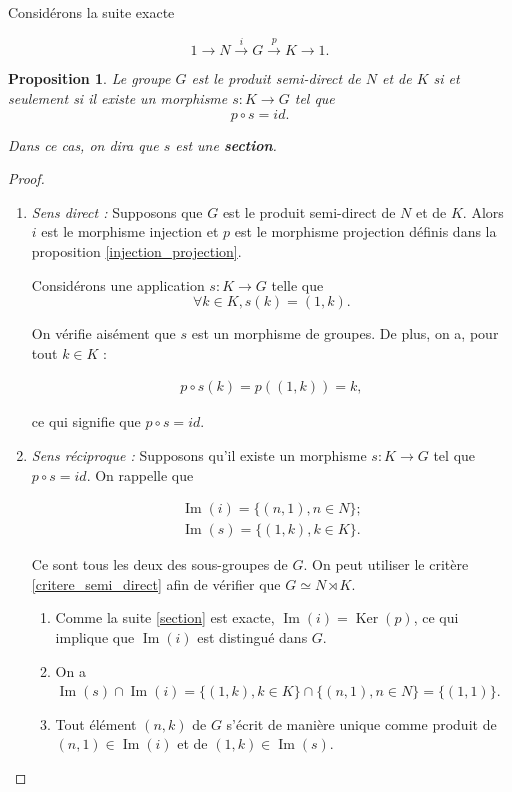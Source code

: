 \documentclass[french]{report}
\newtheorem{prop}{Proposition}[section]
\begin{document}
Considérons la suite exacte

\begin{equation} \label{section}
  1 \longrightarrow N \stackrel{i}{\longrightarrow} G \stackrel{p}{\longrightarrow} K \longrightarrow 1.
\end{equation}

\begin{prop}
  Le groupe $G$ est le produit semi-direct de $N$ et de $K$ si et seulement si il existe un morphisme $s : K \to G$ tel que $$ p \circ s = id.$$

  Dans ce cas, on dira que $s$ est une \textbf{section}.
\end{prop}

\begin{proof}
  \

  \begin{enumerate}
    \item \emph{Sens direct :} Supposons que $G$ est le produit semi-direct de $N$ et de $K$. Alors $i$ est le morphisme injection et $p$ est le morphisme projection définis dans la proposition \ref{injection_projection}.

    Considérons une application $s : K \to G$ telle que $$ \forall k \in K, s(k) = (1, k).$$

    On vérifie aisément que $s$ est un morphisme de groupes. De plus, on a, pour tout $k \in K$ :

    \begin{gather*}
      p \circ s (k) = p((1, k)) = k,
    \end{gather*}

    ce qui signifie que $p \circ s= id$.

    \item \emph{Sens réciproque :} Supposons qu'il existe  un morphisme $s : K \to G$ tel que $p \circ s = id$. On rappelle que

    \begin{gather*}
      \operatorname{Im}(i) = \{ (n,1), n \in N \} ; \\
      \operatorname{Im}(s) =  \{ (1, k), k \in K \} .
    \end{gather*}

    Ce sont tous les deux des sous-groupes de $G$. On peut utiliser le critère \ref{critere_semi_direct} afin de vérifier que $G \simeq N \rtimes K$.

    \begin{enumerate}
      \item Comme la suite \ref{section} est exacte, $\operatorname{Im}(i) = \operatorname{Ker}(p)$, ce qui implique que $\operatorname{Im}(i)$ est distingué dans $G$.
      \item On a $\operatorname{Im}(s) \cap \operatorname{Im}(i) = \{ (1,k), k \in K \} \cap \{ (n,1), n \in N \}  = \{ (1,1) \} $.
      \item Tout élément $(n,k)$ de $G$ s'écrit de manière unique comme produit de $(n,1) \in \operatorname{Im}(i)$ et de $(1,k) \in \operatorname{Im}(s)$.
    \end{enumerate}


\end{enumerate}
\end{proof}
\end{document}
